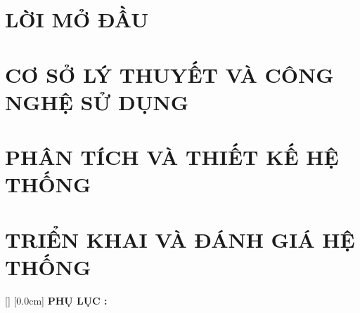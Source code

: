 \documentclass[a4paper,13pt,3p,twoside]{report}
\renewcommand{\bibname}{Danh_sach_tai_lieu_tham_khao}
\theoremstyle{definition}
\begin{document}
\chapter*{LỜI MỞ ĐẦU}


\newpage
\chapter{CƠ SỞ LÝ THUYẾT VÀ CÔNG NGHỆ SỬ DỤNG}
\label{chapter:TheoryAndTech}


\newpage
\chapter{PHÂN TÍCH VÀ THIẾT KẾ HỆ THỐNG} %
\label{chapter:AnalysisDesign}


\newpage
\chapter{TRIỂN KHAI VÀ ĐÁNH GIÁ HỆ THỐNG} %
\label{chapter:DeployEval}


\newpage
% 


\newpage
\renewcommand\bibname{TÀI LIỆU THAM KHẢO}
\printbibliography
{}

\appendixpage
\appendices

[]
\titlespacing*{\chapter}{0pt}{-20pt}{20pt}
    [0.0cm]
    {\bfseries\vspace{0.3cm}}
    {\bfseries PHỤ LỤC \thecontentslabel: }
    {}
    {\contentspage}
\end{document}

